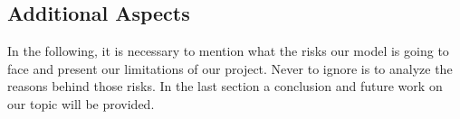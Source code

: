 \documentclass[sigchi-a, authorversion]{acmart}
\begin{document}
\subsection{Additional Aspects}

In the following, it is necessary to mention what the risks our model is going to face and present our limitations of our project. Never to ignore is to analyze the reasons behind those risks.
In the last section a conclusion and future work on our topic will be provided.



\end{document}
